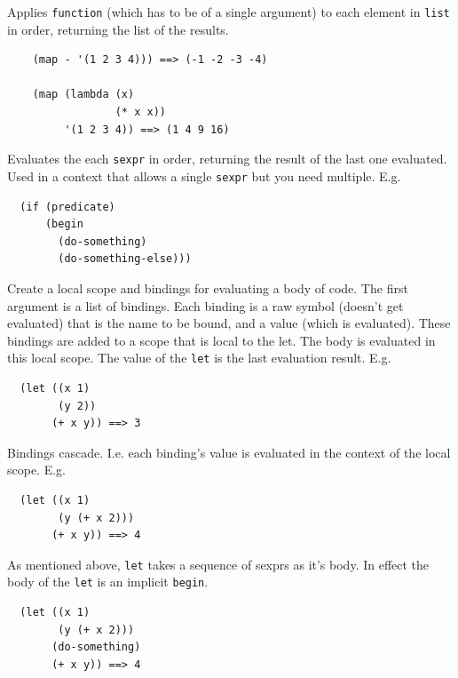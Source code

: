 \documentclass[12pt]{article}
\begin{document}

Applies \verb|function| (which has to be of a single argument) to each
element in \verb|list| in order, returning the list of the results. 

\begin{verbatim}
    (map - '(1 2 3 4))) ==> (-1 -2 -3 -4)

    (map (lambda (x)
                 (* x x))
         '(1 2 3 4)) ==> (1 4 9 16)
\end{verbatim}


Evaluates the each \verb|sexpr| in order, returning the result of the
last one evaluated. Used in a context that allows a single
\verb|sexpr| but you need multiple. E.g.

\begin{verbatim}
  (if (predicate)
      (begin
        (do-something)
        (do-something-else)))
\end{verbatim}


Create a local scope and bindings for evaluating a body of code. The
first argument is a list of bindings. Each binding is a raw symbol
(doesn't get evaluated) that is the name to be bound, and a value
(which is evaluated). These bindings are added to a scope that is
local to the let. The body is evaluated in this local scope. The value
of the \verb|let| is the last evaluation result. E.g.

\begin{verbatim}
  (let ((x 1)
        (y 2))
       (+ x y)) ==> 3
\end{verbatim}

Bindings cascade. I.e. each binding's value is evaluated in the
context of the local scope. E.g.

\begin{verbatim}
  (let ((x 1)
        (y (+ x 2)))
       (+ x y)) ==> 4
\end{verbatim}

As mentioned above, \verb|let| takes a sequence of sexprs as it's
body. In effect the body of the \verb|let| is an implicit
\verb|begin|.

\begin{verbatim}
  (let ((x 1)
        (y (+ x 2)))
       (do-something)
       (+ x y)) ==> 4
\end{verbatim}
\end{document}
